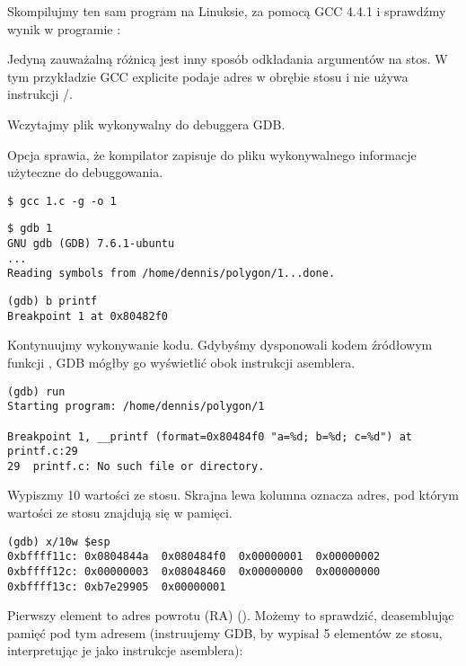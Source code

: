 
Skompilujmy ten sam program na Linuksie, za pomocą GCC 4.4.1 i sprawdźmy wynik w programie \IDA:



Jedyną zauważalną różnicą jest inny sposób odkładania argumentów na stos.
W tym przykładzie GCC explicite podaje adres w obrębie stosu i nie używa instrukcji \PUSH/\POP.


Wczytajmy plik wykonywalny do debuggera \ac{GDB}.

Opcja  sprawia, że kompilator zapisuje do pliku wykonywalnego informacje użyteczne do debuggowania.

\begin{lstlisting}
$ gcc 1.c -g -o 1
\end{lstlisting}

\begin{lstlisting}
$ gdb 1
GNU gdb (GDB) 7.6.1-ubuntu
...
Reading symbols from /home/dennis/polygon/1...done.
\end{lstlisting}

\begin{lstlisting}[caption=Ustawmy breakpoint w funkcji \printf]
(gdb) b printf
Breakpoint 1 at 0x80482f0
\end{lstlisting}

Kontynuujmy wykonywanie kodu.
Gdybyśmy dysponowali kodem źródłowym funkcji \printf, \ac{GDB} mógłby go wyświetlić obok instrukcji asemblera.

\begin{lstlisting}
(gdb) run
Starting program: /home/dennis/polygon/1

Breakpoint 1, __printf (format=0x80484f0 "a=%d; b=%d; c=%d") at printf.c:29
29	printf.c: No such file or directory.
\end{lstlisting}

Wypiszmy 10 wartości ze stosu. Skrajna lewa kolumna oznacza adres, pod którym wartości ze stosu znajdują się w pamięci.

\begin{lstlisting}
(gdb) x/10w $esp
0xbffff11c:	0x0804844a	0x080484f0	0x00000001	0x00000002
0xbffff12c:	0x00000003	0x08048460	0x00000000	0x00000000
0xbffff13c:	0xb7e29905	0x00000001
\end{lstlisting}

Pierwszy element to adres powrotu (\ac{RA}) ().
Możemy to sprawdzić, deasemblując pamięć pod tym adresem (instruujemy GDB, by wypisał 5 elementów ze stosu, interpretując je jako instrukcje asemblera):

